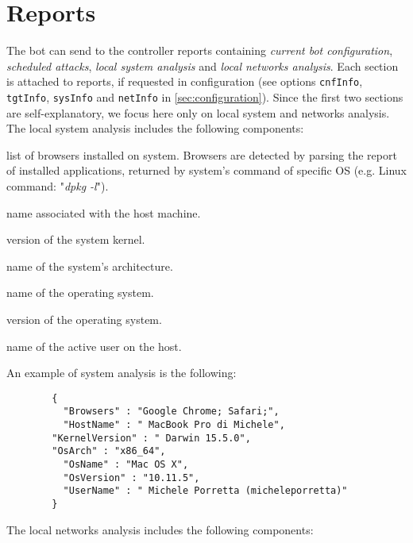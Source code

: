 \section{Reports}
\label{sec:reports}

The bot can send to the controller reports containing \textit{current bot configuration}, \textit{scheduled attacks}, \textit{local system analysis} and \textit{local networks analysis}. Each section is attached to reports, if requested in configuration (see options \texttt{cnfInfo}, \texttt{tgtInfo}, \texttt{sysInfo} and \texttt{netInfo} in \ref{sec:configuration}). Since the first two sections are self-explanatory, we focus here only on local system and networks analysis.\\

The local system analysis includes the following components:
\begin{description}
  \setlength\itemsep{1em}
    \item [browsers] list of browsers installed on system. Browsers are detected by parsing the report of installed applications, returned by system's command of specific OS (e.g. Linux command: "\textit{dpkg -l}").
	\item [hostName] name associated with the host machine.
	\item [kernelVersion] version of the system kernel.
	\item [osArch] name of the system's architecture.
  	\item [osName] name of the operating system.
  	\item [osVersion] version of the operating system.
  	\item [userName] name of the active user on the host.
\end{description}
\;

An example of system analysis is the following:
\begin{description}
	\item 
		\begin{verbatim}
		{
		  "Browsers" : "Google Chrome; Safari;",
		  "HostName" : " MacBook Pro di Michele",
	 	"KernelVersion" : " Darwin 15.5.0",
	 	"OsArch" : "x86_64",
		  "OsName" : "Mac OS X",
		  "OsVersion" : "10.11.5",
		  "UserName" : " Michele Porretta (micheleporretta)"
		}
		\end{verbatim}
\end{description}

The local networks analysis includes the following components:

